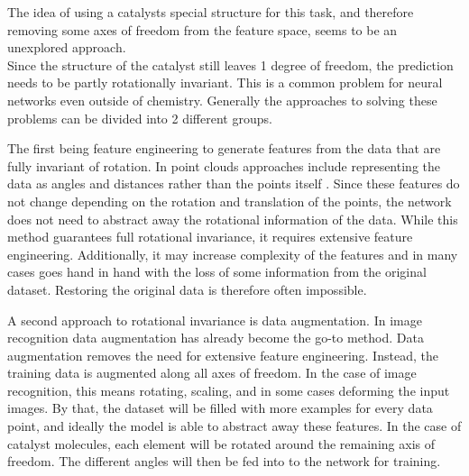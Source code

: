 The idea of using a catalysts special structure for this task, and therefore removing some axes of freedom from the feature space, seems to be an unexplored approach.
\\

Since the structure of the catalyst still leaves 1 degree of freedom, the prediction needs to be partly rotationally invariant.
This is a common problem for neural networks even outside of chemistry.
Generally the approaches to solving these problems can be divided into 2 different groups.

The first being feature engineering to generate features from the data that are fully invariant of rotation.
In point clouds approaches include representing the data as angles and distances rather than the points itself \cite{weiler20183d, 8886052}.
Since these features do not change depending on the rotation and translation of the points, the network does not need to 
abstract away the rotational information of the data.
While this method guarantees full rotational invariance, it requires extensive feature engineering.
Additionally, it may increase complexity of the features and in many cases 
goes hand in hand with the loss of some information from the original dataset. 
Restoring the original data is therefore often impossible.

A second approach to rotational invariance is data augmentation.
In image recognition data augmentation has already become the go-to method.
Data augmentation removes the need for extensive feature engineering.
Instead, the training data is augmented along all axes of freedom.
In the case of image recognition, this means rotating, scaling, and in some cases deforming the input images.
By that, the dataset will be filled with more examples for every data point, and ideally the model is able to 
abstract away these features. %
In the case of catalyst molecules, each element will be rotated around the remaining axis of freedom.
The different angles will then be fed into to the network for training.

